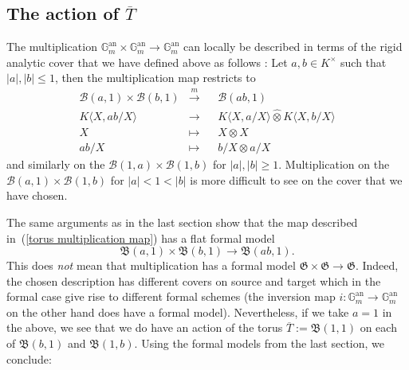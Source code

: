 \documentclass[10pt,oneside]{amsart}
\theoremstyle{definition}
\theoremstyle{remark}
\begin{document}
	\subsection{The action of $\overline{T}$}
	The multiplication $\mathbb G_m^{\operatorname{an}}\times \mathbb G_m^{\operatorname{an}}\rightarrow \mathbb G_m^{\operatorname{an}}$ can locally be described in terms of the rigid analytic cover that we have defined above as follows  : Let $a,b \in K^\times$ such that $|a|,|b|\leq 1$, then the multiplication map restricts to
	\begin{equation}
	\begin{alignedat}{2} \label{torus multiplication map}
	\mathcal B(a,1)\times \mathcal B(b,1)&\xrightarrow{m}&& \mathcal B(ab,1)\\
	K\langle X,ab/X\rangle&\rightarrow &&K\langle X,a/X\rangle\widehat{\otimes} K\langle X,b/X\rangle\\
	X&\mapsto&& X\otimes X\\
	ab/X&\mapsto&& b/X\otimes a/X
	\end{alignedat}
	\end{equation}
	and similarly on the $\mathcal B(1,a)\times \mathcal B(1,b)$ for $|a|,|b|\geq 1$. Multiplication on the $\mathcal B(a,1)\times \mathcal B(1,b)$ for $|a|< 1 < |b|$ is more difficult to see on the cover that we have chosen.
	
	The same arguments as in the last section show that the map described in~(\ref{torus multiplication map}) has a flat formal model
	\[\mathfrak B(a,1)\times \mathfrak B(b,1)\rightarrow \mathfrak B(ab,1).\]
	This does \textit{not} mean that multiplication has a formal model $\mathfrak G\times \mathfrak G\rightarrow \mathfrak G$. Indeed, the chosen description has different covers on source and target which in the formal case give rise to different formal schemes (the inversion map $i:\mathbb G_m^{\operatorname{an}}\rightarrow \mathbb G_m^{\operatorname{an}}$ on the other hand does have a formal model). Nevertheless, if we take $a=1$ in the above, we see that we do have an action of the torus $\overline{T}:=\mathfrak B(1,1)$ on each of $\mathfrak B(b,1)$ and $\mathfrak B(1,b)$. Using the formal models from the last section, we conclude:
	
\end{document}
